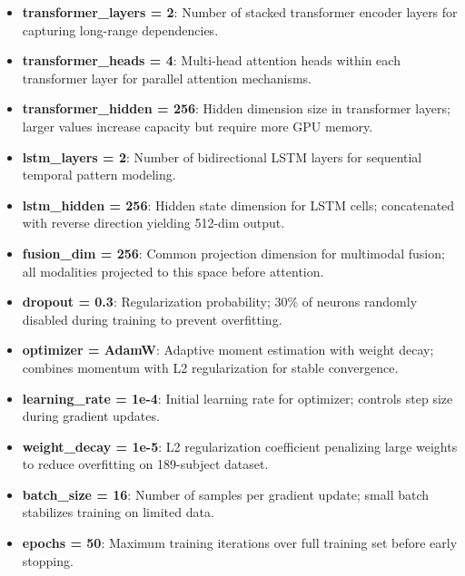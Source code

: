 \documentclass[12pt]{article}
\begin{document}
	\begin{itemize}
		\item \textbf{transformer\_layers = 2}: Number of stacked transformer encoder layers for capturing long-range dependencies.

		\item \textbf{transformer\_heads = 4}: Multi-head attention heads within each transformer layer for parallel attention mechanisms.

		\item \textbf{transformer\_hidden = 256}: Hidden dimension size in transformer layers; larger values increase capacity but require more GPU memory.

		\item \textbf{lstm\_layers = 2}: Number of bidirectional LSTM layers for sequential temporal pattern modeling.

		\item \textbf{lstm\_hidden = 256}: Hidden state dimension for LSTM cells; concatenated with reverse direction yielding 512-dim output.

		\item \textbf{fusion\_dim = 256}: Common projection dimension for multimodal fusion; all modalities projected to this space before attention.

		\item \textbf{dropout = 0.3}: Regularization probability; 30\% of neurons randomly disabled during training to prevent overfitting.

		\item \textbf{optimizer = AdamW}: Adaptive moment estimation with weight decay; combines momentum with L2 regularization for stable convergence.

		\item \textbf{learning\_rate = 1e-4}: Initial learning rate for optimizer; controls step size during gradient updates.

		\item \textbf{weight\_decay = 1e-5}: L2 regularization coefficient penalizing large weights to reduce overfitting on 189-subject dataset.

		\item \textbf{batch\_size = 16}: Number of samples per gradient update; small batch stabilizes training on limited data.

		\item \textbf{epochs = 50}: Maximum training iterations over full training set before early stopping.


\end{itemize}
\end{document}

